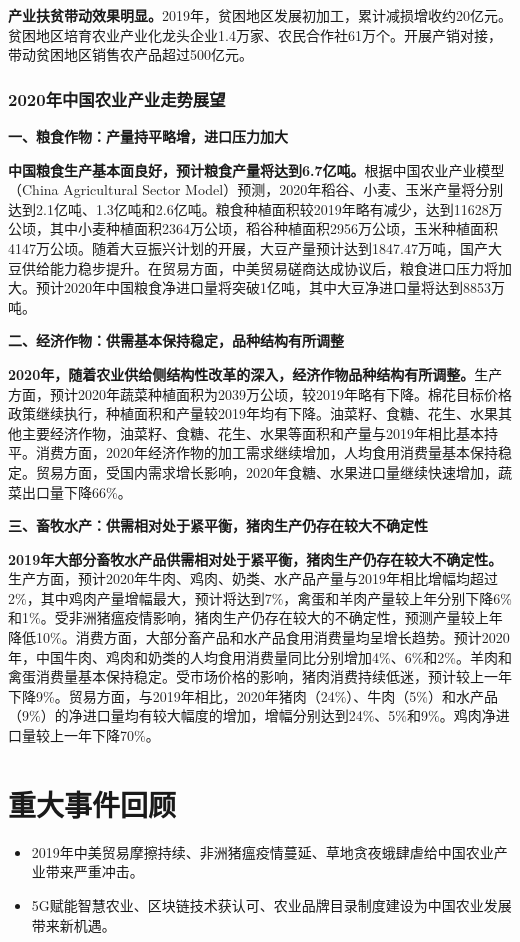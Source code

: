 \documentclass{progbookcn}
\begin{document}
    \textbf{产业扶贫带动效果明显。}2019年，贫困地区发展初加工，累计减损增收约20亿元。贫困地区培育农业产业化龙头企业1.4万家、农民合作社61万个。开展产销对接，带动贫困地区销售农产品超过500亿元。


\subsection{2020年中国农业产业走势展望}
\textbf{一、粮食作物：产量持平略增，进口压力加大}

\textbf{中国粮食生产基本面良好，预计粮食产量将达到6.7亿吨。}根据中国农业产业模型（China Agricultural Sector Model）预测，2020年稻谷、小麦、玉米产量将分别达到2.1亿吨、1.3亿吨和2.6亿吨。粮食种植面积较2019年略有减少，达到11628万公顷，其中小麦种植面积2364万公顷，稻谷种植面积2956万公顷，玉米种植面积4147万公顷。随着大豆振兴计划的开展，大豆产量预计达到1847.47万吨，国产大豆供给能力稳步提升。在贸易方面，中美贸易磋商达成协议后，粮食进口压力将加大。预计2020年中国粮食净进口量将突破1亿吨，其中大豆净进口量将达到8853万吨。

\textbf{二、经济作物：供需基本保持稳定，品种结构有所调整}

\textbf{2020年，随着农业供给侧结构性改革的深入，经济作物品种结构有所调整。}生产方面，预计2020年蔬菜种植面积为2039万公顷，较2019年略有下降。棉花目标价格政策继续执行，种植面积和产量较2019年均有下降。油菜籽、食糖、花生、水果其他主要经济作物，油菜籽、食糖、花生、水果等面积和产量与2019年相比基本持平。消费方面，2020年经济作物的加工需求继续增加，人均食用消费量基本保持稳定。贸易方面，受国内需求增长影响，2020年食糖、水果进口量继续快速增加，蔬菜出口量下降66\%。

\textbf{三、畜牧水产：供需相对处于紧平衡，猪肉生产仍存在较大不确定性}

\textbf{2019年大部分畜牧水产品供需相对处于紧平衡，猪肉生产仍存在较大不确定性。}生产方面，预计2020年牛肉、鸡肉、奶类、水产品产量与2019年相比增幅均超过2\%，其中鸡肉产量增幅最大，预计将达到7\%，禽蛋和羊肉产量较上年分别下降6\%和1\%。受非洲猪瘟疫情影响，猪肉生产仍存在较大的不确定性，预测产量较上年降低10\%。消费方面，大部分畜产品和水产品食用消费量均呈增长趋势。预计2020年，中国牛肉、鸡肉和奶类的人均食用消费量同比分别增加4\%、6\%和2\%。羊肉和禽蛋消费量基本保持稳定。受市场价格的影响，猪肉消费持续低迷，预计较上一年下降9\%。贸易方面，与2019年相比，2020年猪肉（24\%）、牛肉（5\%）和水产品（9\%）的净进口量均有较大幅度的增加，增幅分别达到24\%、5\%和9\%。鸡肉净进口量较上一年下降70\%。



\chapter{重大事件回顾}
\begin{titledbox}{}
\begin{itemize}
  \item 2019年中美贸易摩擦持续、非洲猪瘟疫情蔓延、草地贪夜蛾肆虐给中国农业产业带来严重冲击。
  \item 5G赋能智慧农业、区块链技术获认可、农业品牌目录制度建设为中国农业发展带来新机遇。
 \end{itemize}
\end{titledbox}
\end{document}
